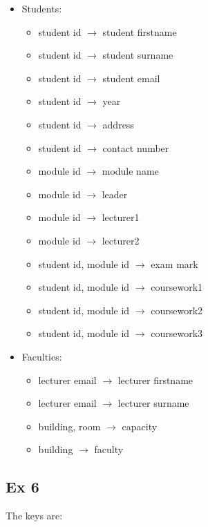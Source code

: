 \begin{itemize}

    \item Students:
    \begin{itemize}
        \item student id $\rightarrow$ student firstname
        \item student id $\rightarrow$ student surname
        \item student id $\rightarrow$ student email
        \item student id $\rightarrow$ year
        \item student id $\rightarrow$ address
        \item student id $\rightarrow$ contact number
        \item module id $\rightarrow$ module name
        \item module id $\rightarrow$ leader
        \item module id $\rightarrow$ lecturer1
        \item module id $\rightarrow$ lecturer2
        \item student id, module id $\rightarrow$ exam mark
        \item student id, module id $\rightarrow$ coursework1
        \item student id, module id $\rightarrow$ coursework2
        \item student id, module id $\rightarrow$ coursework3
    \end{itemize}
    
    \item Faculties:
    \begin{itemize}
        \item lecturer email $\rightarrow$ lecturer firstname
        \item lecturer email $\rightarrow$ lecturer surname
        \item building, room $\rightarrow$ capacity
        \item building $\rightarrow$ faculty
    \end{itemize}
    
\end{itemize}


\subsection*{Ex 6}

The keys are:

